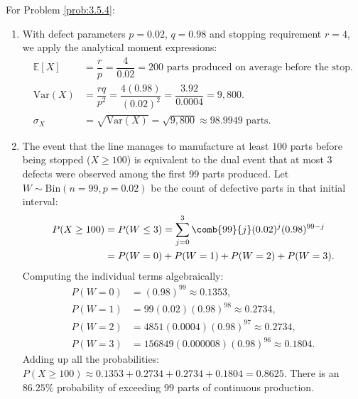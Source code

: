 \begin{solucion}
	\label{sol:3.5.4}
	For Problem \ref{prob:3.5.4}:
	\begin{enumerate}
		\item With defect parameters $p = 0.02$, $q = 0.98$ and stopping requirement $r = 4$, we apply the analytical moment expressions:
		\begin{align*}
			\mathbb{E}[X] &= \dfrac{r}{p} = \dfrac{4}{0.02} = 200 \text{ parts produced on average before the stop.} \\
			\text{Var}(X) &= \dfrac{rq}{p^2} = \dfrac{4(0.98)}{(0.02)^2} = \dfrac{3.92}{0.0004} = 9,800. \\
			\sigma_X &= \sqrt{\text{Var}(X)} = \sqrt{9,800} \approx 98.9949 \text{ parts.}
		\end{align*}
		\item The event that the line manages to manufacture at least $100$ parts before being stopped ($X \ge 100$) is equivalent to the dual event that at most $3$ defects were observed among the first $99$ parts produced. Let $W \sim \text{Bin}(n=99, p=0.02)$ be the count of defective parts in that initial interval:
		\begin{align*}
			P(X \ge 100) &= P(W \le 3) = \sum_{j=0}^3 \comb{99}{j} (0.02)^j (0.98)^{99-j} \\
			&= P(W=0) + P(W=1) + P(W=2) + P(W=3).
		\end{align*}
		Computing the individual terms algebraically:
		\begin{align*}
			P(W=0) &= (0.98)^{99} \approx 0.1353, \\
			P(W=1) &= 99(0.02)(0.98)^{98} \approx 0.2734, \\
			P(W=2) &= 4851(0.0004)(0.98)^{97} \approx 0.2734, \\
			P(W=3) &= 156849(0.000008)(0.98)^{96} \approx 0.1804.
		\end{align*}
		Adding up all the probabilities: $P(X \ge 100) \approx 0.1353 + 0.2734 + 0.2734 + 0.1804 = 0.8625$. There is an $86.25\%$ probability of exceeding $99$ parts of continuous production.
	\end{enumerate}
\end{solucion}

